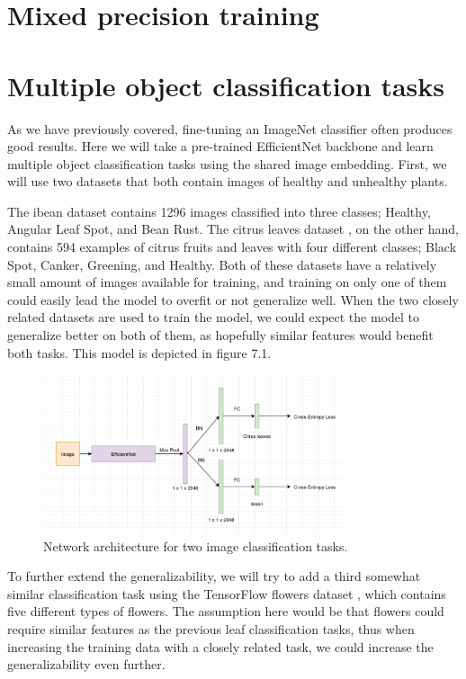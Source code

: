 \section{Mixed precision training}

\section{Multiple object classification tasks}
As we have previously covered, fine-tuning an ImageNet classifier often produces good results.
Here we will take a pre-trained EfficientNet backbone and learn multiple object classification tasks using the shared image embedding.
First, we will use two datasets that both contain images of healthy and unhealthy plants.

The ibean dataset \citep{beansdata} contains 1296 images classified into three classes; Healthy, Angular Leaf Spot, and Bean Rust.
The citrus leaves dataset \citep{citrusdata}, on the other hand, contains 594 examples of citrus fruits and leaves with four different classes; Black Spot, Canker, Greening, and Healthy.
Both of these datasets have a relatively small amount of images available for training, and training on only one of them could easily lead the model to overfit or not generalize well.
When the two closely related datasets are used to train the model, we could expect the model to generalize better on both of them, as hopefully similar features would benefit both tasks.
This model is depicted in figure 7.1.

\begin{figure}[h!]
    \centering
    \includegraphics[width=0.8\textwidth]{imgs/object_classification_architecture.png}
    \caption{Network architecture for two image classification tasks.}
\end{figure}

To further extend the generalizability, we will try to add a third somewhat similar classification task using the TensorFlow flowers dataset \citep{tfflowers}, which contains five different types of flowers.
The assumption here would be that flowers could require similar features as the previous leaf classification tasks, thus when increasing the training data with a closely related task, we could increase the generalizability even further.

